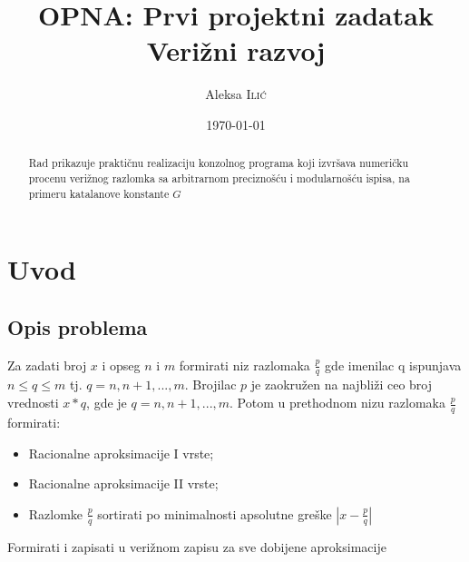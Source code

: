 \documentclass[a4paper,10pt]{article}
\title{OPNA: Prvi projektni zadatak \\ Verižni razvoj} %
\author{Aleksa \textsc{Ilić}} %
\date{\today} %
\begin{document}
\maketitle %

\begin{abstract}
    Rad prikazuje praktičnu realizaciju konzolnog programa koji izvršava numeričku procenu verižnog razlomka sa arbitrarnom preciznošću i modularnošću ispisa, na primeru katalanove konstante $G$
\end{abstract}


\section{Uvod}
\subsection{Opis problema}

Za zadati broj $\mathit{x}$ i opseg $\mathit{n}$ i $\mathit{m}$ formirati niz razlomaka $\frac{p}{q}$ gde imenilac q ispunjava 
$\mathit{n \leq q \leq m}$ tj. $\mathit{q = n, n+1, ..., m}$. Brojilac $\mathit{p}$ je zaokružen na najbliži ceo broj vrednosti $\mathit{x*q}$, gde je $\mathit{q = n, n+1, ..., m}$. Potom u prethodnom nizu razlomaka $\frac{p}{q}$ formirati:

\begin{itemize}
\item Racionalne aproksimacije I vrste;
\item Racionalne aproksimacije II vrste;
\item Razlomke $\frac{p}{q}$ sortirati po minimalnosti apsolutne greške $\left|\mathit{x-\frac{p}{q}}\right|$
\end{itemize}

Formirati i zapisati u verižnom zapisu za sve dobijene aproksimacije
\end{document}
